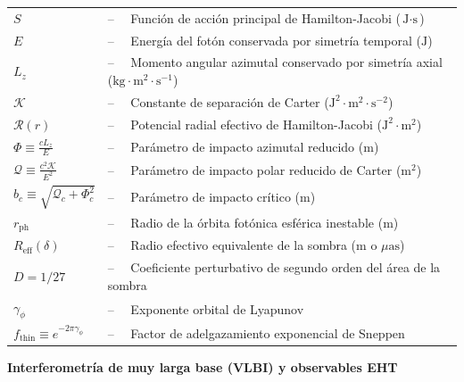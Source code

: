 \begin{tabular}{ll}
$S$ & --$\quad$ Función de acción principal de Hamilton-Jacobi ($\text{J}\cdot\text{s}$)\\
$E$ & --$\quad$ Energía del fotón conservada por simetría temporal ($\text{J}$)\\
$L_z$ & --$\quad$ Momento angular azimutal conservado por simetría axial ($\text{kg}\cdot\text{m}^2\cdot\text{s}^{-1}$)\\
$\mathcal{K}$ & --$\quad$ Constante de separación de Carter ($\text{J}^2\cdot\text{m}^2\cdot\text{s}^{-2}$)\\
$\mathcal{R}(r)$ & --$\quad$ Potencial radial efectivo de Hamilton-Jacobi ($\text{J}^2\cdot\text{m}^2$)\\
$\Phi \equiv \frac{c L_z}{E}$ & --$\quad$ Parámetro de impacto azimutal reducido ($\text{m}$)\\
$\mathcal{Q} \equiv \frac{c^2 \mathcal{K}}{E^2}$ & --$\quad$ Parámetro de impacto polar reducido de Carter ($\text{m}^2$)\\
$b_c \equiv \sqrt{\mathcal{Q}_c + \Phi_c^2}$ & --$\quad$ Parámetro de impacto crítico ($\text{m}$)\\
$r_{\mathrm{ph}}$ & --$\quad$ Radio de la órbita fotónica esférica inestable ($\text{m}$)\\
$R_{\mathrm{eff}}(\delta)$ & --$\quad$ Radio efectivo equivalente de la sombra ($\text{m}$ o $\mu\text{as}$)\\
$D = 1/27$ & --$\quad$ Coeficiente perturbativo de segundo orden del área de la sombra\\
$\gamma_\phi$ & --$\quad$ Exponente orbital de Lyapunov\\
$f_{\mathrm{thin}} \equiv e^{-2\pi\gamma_\phi}$ & --$\quad$ Factor de adelgazamiento exponencial de Sneppen\\
\end{tabular}

\vspace{0.5cm}
\noindent\textbf{Interferometría de muy larga base (VLBI) y observables EHT}
\vspace{0.2cm}

